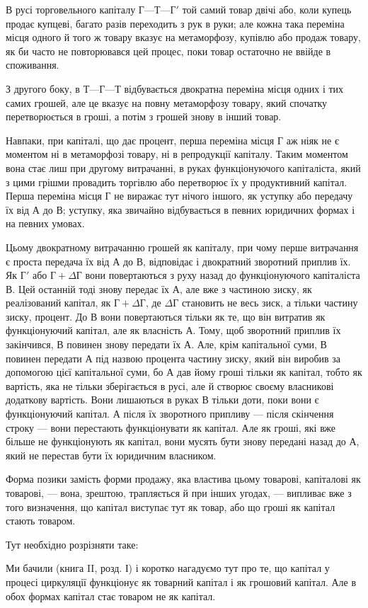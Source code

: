 
В русі торговельного капіталу $Г — Т — Г'$ той самий товар
двічі або, коли купець продає купцеві, багато разів переходить
з рук в руки; але кожна така переміна місця одного й того ж
товару вказує на метаморфозу, купівлю або продаж товару,
як би часто не повторювався цей процес, поки товар остаточно
не ввійде в споживання.

З другого боку, в $Т — Г — Т$ відбувається двократна переміна
місця одних і тих самих грошей, але це вказує на повну
метаморфозу товару, який спочатку перетворюється в гроші,
а потім з грошей знову в інший товар.

Навпаки, при капіталі, що дає процент, перша переміна місця
$Г$ аж ніяк не є моментом ні в метаморфозі товару, ні в репродукції
капіталу. Таким моментом вона стає лиш при другому
витрачанні, в руках функціонуючого капіталіста, який з цими
грішми провадить торгівлю або перетворює їх у продуктивний
капітал. Перша переміна місця $Г$ не виражає тут нічого іншого,
як уступку або передачу їх від $А$ до $В$; уступку, яка звичайно
відбувається в певних юридичних формах і на певних умовах.

Цьому двократному витрачанню грошей як капіталу, при
чому перше витрачання є проста передача їх від $А$ до $В$, відповідає
і двократний зворотний приплив їх. Як $Г'$ або $Г + ΔГ$ вони
повертаються з руху назад до функціонуючого капіталіста В.
Цей останній тоді знову передає їх $А$, але вже з частиною
зиску, як реалізований капітал, як $Г + ΔГ$, де $ΔГ$ становить
не весь зиск, а тільки частину зиску, процент. До $В$ вони повертаються
тільки як те, що він витратив як функціонуючий
капітал, але як власність $А$. Тому, щоб зворотний приплив їх
закінчився, $В$ повинен знову передати їх $А$. Але, крім капітальної
суми, $В$ повинен передати $А$ під назвою процента частину
зиску, який він виробив за допомогою цієї капітальної суми,
бо $А$ дав йому гроші тільки як капітал, тобто як вартість, яка
не тільки зберігається в русі, але й створює своєму власникові
додаткову вартість. Вони лишаються в руках $В$ тільки доти,
поки вони є функціонуючий капітал. А після їх зворотного
припливу — після скінчення строку — вони перестають функціонувати
як капітал. Але як гроші, які вже більше не функціонують
як капітал, вони мусять бути знову передані назад до $А$,
який не перестав бути їх юридичним власником.

Форма позики замість форми продажу, яка властива цьому
товарові, капіталові як товарові, — вона, зрештою, трапляється
й при інших угодах, — випливає вже з того визначення, що
капітал виступає тут як товар, або що гроші як капітал стають
товаром.

Тут необхідно розрізняти таке:

Ми бачили (книга II, розд. І) і коротко нагадуємо тут про те,
що капітал у процесі циркуляції функціонує як товарний капітал
і як грошовий капітал. Але в обох формах капітал стає
товаром не як капітал.
